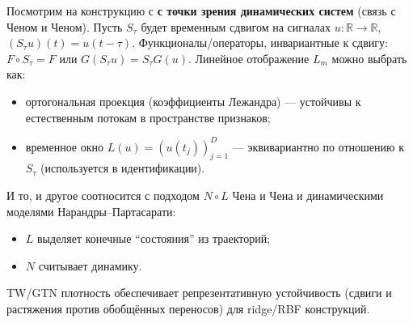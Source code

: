 \documentclass[../NDCNNAI_main.tex]{subfiles}
\begin{document}
Посмотрим на конструкцию с \textbf{с точки зрения динамических систем} (связь с Ченом и Ченом).
Пусть $S_\tau$ будет временным сдвигом на сигналах $u\colon \mathbb{R} \to \mathbb{R}$, $(S_\tau u)(t) = u(t - \tau)$.
Функционалы/операторы, инвариантные к сдвигу: $F \circ S_\tau = F$ или $G(S_\tau u) = S_\tau G(u)$.
Линейное отображение $L_m$ можно выбрать как:
\begin{itemize}
  \item ортогональная проекция (коэффициенты Лежандра) --- устойчивы к естественным потокам в пространстве признаков;
  \item временное окно $L(u) = (u(t_j))_{j=1}^D$ --- эквивариантно по отношению к $S_\tau$ (используется в идентификации).
\end{itemize}
И то, и другое соотносится с подходом $N \circ L$ Чена и Чена и динамическими моделями Нарандры--Партасарати:
\begin{itemize}
  \item $L$ выделяет конечные ``состояния'' из траекторий;
  \item $N$ считывает динамику.
\end{itemize}
TW/GTN плотность обеспечивает репрезентативную устойчивость (сдвиги и растяжения против обобщённых переносов) для ridge/RBF конструкций.
\end{document}
